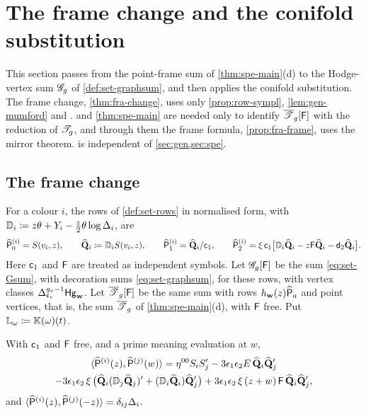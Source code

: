 \section{The frame change and the conifold substitution}
\label{sec:fra}

This section passes from the point-frame sum of \cref{thm:spe-main}\textup{(d)} to the Hodge-vertex sum $\mathscr{G}_g$ of \cref{def:set-graphsum}, and then applies the conifold substitution. The frame change, \cref{thm:fra-change}, uses only \cref{prop:row-sympl}, \cref{lem:gen-mumford} and \cite[Definitions~2.2, 2.5, 2.13 and Proposition~2.14]{PPZ15}.  and \cref{thm:spe-main} are needed only to identify $\overline{\mathscr{T}}_g[\mathsf{F}]$ with the reduction of $\mathscr{T}_g$, and through them the frame formula, \cref{prop:fra-frame}, uses the mirror theorem.  is independent of \cref{sec:gen,sec:spe}.

\subsection{The frame change}

For a colour $i$, the rows of \cref{def:set-rows} in normalised form, with $\mathbb{D}_i\coloneqq z\theta+Y_i-\frac z2\theta\log\Delta_i$, are
\begin{gather*}
\widehat{\mathsf{P}}_0^{(i)}=S(v_i,z),\qquad\widehat{\mathbf{Q}}_i\coloneqq\mathbb{D}_iS(v_i,z),\qquad\widehat{\mathsf{P}}_1^{(i)}=\widehat{\mathbf{Q}}_i/\mathsf{c}_{1},\qquad
\widehat{\mathsf{P}}_2^{(i)}=\xi\,\mathsf{c}_{1}\big[\mathbb{D}_i\widehat{\mathbf{Q}}_i-z\mathsf{F}\widehat{\mathbf{Q}}_i-\mathsf{d}_{2}\widehat{\mathbf{Q}}_i\big].
\end{gather*}
Here $\mathsf{c}_{1}$ and $\mathsf{F}$ are treated as independent symbols. Let $\mathscr{G}_g[\mathsf{F}]$ be the sum \eqref{eq:set-Gsum}, with decoration sums \eqref{eq:set-graphsum}, for these rows, with vertex classes $\Delta_{\mathfrak{c}_v}^{g_v-1}\mathsf{Hg}_{\mathbf{w}}$. Let $\overline{\mathscr{T}}_g[\mathsf{F}]$ be the same sum with rows $h_{\mathbf{w}}(z)\widehat{\mathsf{P}}_a$ and point vertices, that is, the sum $\overline{\mathscr{T}}_g$ of \cref{thm:spe-main}\textup{(d)}, with $\mathsf{F}$ free. Put $\mathbb{L}_{\omega}\coloneqq\mathbb{K}(\omega)(t)$.

\begin{lem}
\label{lem:fra-setup}
With $\mathsf{c}_{1}$ and $\mathsf{F}$ free, and a prime meaning evaluation at $w$,
\begin{multline}
\label{eq:fra-pair}
\langle\widehat{\mathsf{P}}^{(i)}(z),\widehat{\mathsf{P}}^{(j)}(w)\rangle=\eta^{00}S_iS_j'-3\epsilon_1\epsilon_2E\,\widehat{\mathbf{Q}}_i\widehat{\mathbf{Q}}_j'\\
-3\epsilon_1\epsilon_2\,\xi\,\big(\widehat{\mathbf{Q}}_i(\mathbb{D}_j\widehat{\mathbf{Q}}_j)'+(\mathbb{D}_i\widehat{\mathbf{Q}}_i)\widehat{\mathbf{Q}}_j'\big)+3\epsilon_1\epsilon_2\,\xi\,(z+w)\,\mathsf{F}\,\widehat{\mathbf{Q}}_i\widehat{\mathbf{Q}}_j',
\end{multline}
and $\langle\widehat{\mathsf{P}}^{(i)}(z),\widehat{\mathsf{P}}^{(j)}(-z)\rangle=\delta_{ij}\Delta_i$.
\end{lem}

